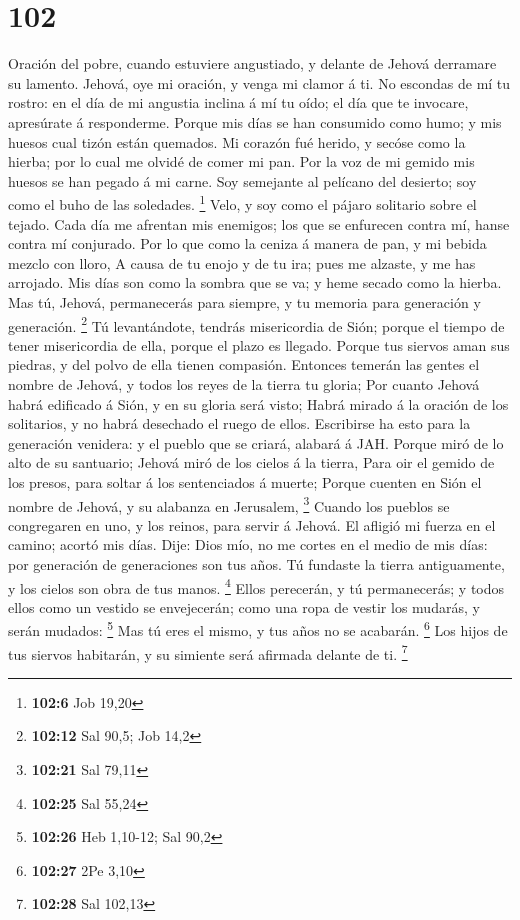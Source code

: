 \hypertarget{section-101}{%
\section{102}\label{section-101}}

 Oración del pobre, cuando estuviere angustiado, y delante
de Jehová derramare su lamento. Jehová, oye mi oración, y venga mi
clamor á ti.  No escondas de mí tu rostro: en el día de mi
angustia inclina á mí tu oído; el día que te invocare, apresúrate á
responderme.  Porque mis días se han consumido como humo; y
mis huesos cual tizón están quemados.  Mi corazón fué
herido, y secóse como la hierba; por lo cual me olvidé de comer mi pan.
 Por la voz de mi gemido mis huesos se han pegado á mi
carne.  Soy semejante al pelícano del desierto; soy como el
buho de las soledades. \footnote{\textbf{102:6} Job 19,20} 
Velo, y soy como el pájaro solitario sobre el tejado.  Cada
día me afrentan mis enemigos; los que se enfurecen contra mí, hanse
contra mí conjurado.  Por lo que como la ceniza á manera de
pan, y mi bebida mezclo con lloro,  A causa de tu enojo y
de tu ira; pues me alzaste, y me has arrojado.  Mis días
son como la sombra que se va; y heme secado como la hierba.
 Mas tú, Jehová, permanecerás para siempre, y tu memoria
para generación y generación. \footnote{\textbf{102:12} Sal 90,5; Job
  14,2}  Tú levantándote, tendrás misericordia de Sión;
porque el tiempo de tener misericordia de ella, porque el plazo es
llegado.  Porque tus siervos aman sus piedras, y del polvo
de ella tienen compasión.  Entonces temerán las gentes el
nombre de Jehová, y todos los reyes de la tierra tu gloria;
 Por cuanto Jehová habrá edificado á Sión, y en su gloria
será visto;  Habrá mirado á la oración de los solitarios, y
no habrá desechado el ruego de ellos.  Escribirse ha esto
para la generación venidera: y el pueblo que se criará, alabará á JAH.
 Porque miró de lo alto de su santuario; Jehová miró de los
cielos á la tierra,  Para oir el gemido de los presos, para
soltar á los sentenciados á muerte;  Porque cuenten en Sión
el nombre de Jehová, y su alabanza en Jerusalem, \footnote{\textbf{102:21}
  Sal 79,11}  Cuando los pueblos se congregaren en uno, y
los reinos, para servir á Jehová.  El afligió mi fuerza en
el camino; acortó mis días.  Dije: Dios mío, no me cortes
en el medio de mis días: por generación de generaciones son tus años.
 Tú fundaste la tierra antiguamente, y los cielos son obra
de tus manos. \footnote{\textbf{102:25} Sal 55,24}  Ellos
perecerán, y tú permanecerás; y todos ellos como un vestido se
envejecerán; como una ropa de vestir los mudarás, y serán mudados:
\footnote{\textbf{102:26} Heb 1,10-12; Sal 90,2}  Mas tú
eres el mismo, y tus años no se acabarán. \footnote{\textbf{102:27} 2Pe
  3,10}  Los hijos de tus siervos habitarán, y su simiente
será afirmada delante de ti. \footnote{\textbf{102:28} Sal 102,13}

